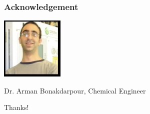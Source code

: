 \documentclass{beamer}
\begin{document}



\begin{frame}
\frametitle{Acknowledgement}

\centerline{\includegraphics[width=3cm]{arman}}
\vspace{1cm}
\centering
Dr. Arman Bonakdarpour, Chemical Engineer
\end{frame}

\begin{frame}
 \begin{center}
  \Huge{Thanks!}
 \end{center}

\end{frame}
\end{document}
